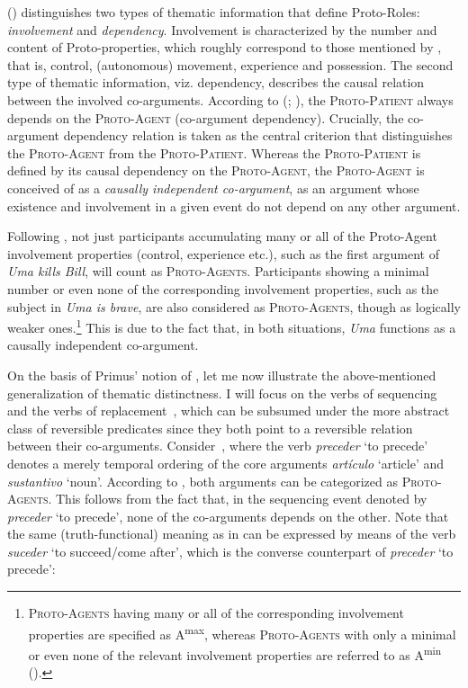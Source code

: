 \documentclass[output=paper]{LSP/langsci}
\begin{document}
\citeauthor{Primus1999Cases} (\citeyear*{Primus1999Cases,Primus1999Rektionsprinzipien,Primus2006Hierarchy}) distinguishes two types of thematic information that define Proto-Roles: \textit{involvement} and \textit{dependency}. Involvement is characterized by the number and content of Proto-properties, which roughly correspond to those mentioned by \citet[573]{Dowty1991Thematic}, that is, control, (autonomous) movement, experience and possession. The second type of thematic information, viz. dependency, describes the causal relation between the involved co-arguments. According to \citeauthor{Primus1999Cases} (\citeyear[52]{Primus1999Cases}; \citeyear[56]{Primus2006Hierarchy}), the \textsc{Proto-Patient} always depends on the \textsc{Proto-Agent} (co-argument dependency). Crucially, the co-argument dependency relation is taken as the central criterion that distinguishes the \textsc{Proto-Agent} from the \textsc{Proto-Patient}. Whereas the \textsc{Proto-Patient} is defined by its causal dependency on the \textsc{Proto-Agent,} the \textsc{Proto-Agent} is conceived of as a \textit{causally independent co-argument}, \ie as an argument whose existence and involvement in a given event do not depend on any other argument. 

Following \citet{Primus2006Hierarchy}, not just participants accumulating many or all of the Proto-Agent involvement properties (control, experience etc.), such as the first argument of \textit{Uma kills Bill}, will count as \textsc{Proto-Agents}. Participants showing a minimal number or even none of the corresponding involvement properties, such as the subject in \textit{Uma is brave}, are also considered as \textsc{Proto-Agents}, though as logically weaker ones.\footnote{\textsc{Proto-Agents} having many or all of the corresponding involvement properties are specified as A\textsuperscript{max}, whereas \textsc{Proto-Agents} with only a minimal or even none of the relevant involvement properties are referred to as A\textsuperscript{min} (\cf \citealt[61]{Primus2006Hierarchy}).} This is due to the fact that, in both situations, \textit{Uma} functions as a causally independent co-argument.

On the basis of Primus’ notion of , let me now illustrate the above-mentioned generalization of thematic distinctness. I will focus on the verbs of sequencing~ and the verbs of replacement~, which can be subsumed under the more abstract class of reversible predicates since they both point to a reversible relation between their co-arguments. Consider~, where the verb \textit{preceder} ‘to precede’ denotes a merely temporal ordering of the core arguments \textit{artículo} ‘article’ and \textit{sustantivo} ‘noun’. According to \citet[56]{Primus2006Hierarchy}, both arguments can be categorized as \textsc{Proto-Agents}. This follows from the fact that, in the sequencing event denoted by \textit{preceder} ‘to precede’, none of the co-arguments depends on the other. Note that the same (truth-functional) meaning as in  can be expressed by means of the verb \textit{suceder} ‘to succeed/come after’, which is the converse counterpart of \textit{preceder} ‘to precede’: 
\end{document}

